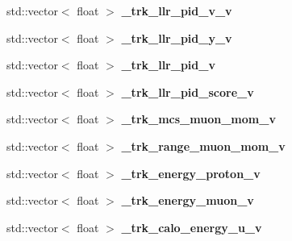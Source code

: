 \begin{DoxyCompactItemize}
\item 
std\+::vector$<$ float $>$ {\bfseries \+\_\+trk\+\_\+llr\+\_\+pid\+\_\+v\+\_\+v}\hypertarget{classanalysis_1_1TrackAnalysis_aed8218478edadddb4d6503686c16448a}{}\label{classanalysis_1_1TrackAnalysis_aed8218478edadddb4d6503686c16448a}

\item 
std\+::vector$<$ float $>$ {\bfseries \+\_\+trk\+\_\+llr\+\_\+pid\+\_\+y\+\_\+v}\hypertarget{classanalysis_1_1TrackAnalysis_a725c93a33d3da91b525b9b1c9d0aad95}{}\label{classanalysis_1_1TrackAnalysis_a725c93a33d3da91b525b9b1c9d0aad95}

\item 
std\+::vector$<$ float $>$ {\bfseries \+\_\+trk\+\_\+llr\+\_\+pid\+\_\+v}\hypertarget{classanalysis_1_1TrackAnalysis_a15121d48891dfed8fbcd02b97875a845}{}\label{classanalysis_1_1TrackAnalysis_a15121d48891dfed8fbcd02b97875a845}

\item 
std\+::vector$<$ float $>$ {\bfseries \+\_\+trk\+\_\+llr\+\_\+pid\+\_\+score\+\_\+v}\hypertarget{classanalysis_1_1TrackAnalysis_a8747290da87b94faec836c472dea9822}{}\label{classanalysis_1_1TrackAnalysis_a8747290da87b94faec836c472dea9822}

\item 
std\+::vector$<$ float $>$ {\bfseries \+\_\+trk\+\_\+mcs\+\_\+muon\+\_\+mom\+\_\+v}\hypertarget{classanalysis_1_1TrackAnalysis_a8c72ab8bf9729ad741b1fcdb1b8916b3}{}\label{classanalysis_1_1TrackAnalysis_a8c72ab8bf9729ad741b1fcdb1b8916b3}

\item 
std\+::vector$<$ float $>$ {\bfseries \+\_\+trk\+\_\+range\+\_\+muon\+\_\+mom\+\_\+v}\hypertarget{classanalysis_1_1TrackAnalysis_a99b7d6a37b1db9ed9875106d7981da17}{}\label{classanalysis_1_1TrackAnalysis_a99b7d6a37b1db9ed9875106d7981da17}

\item 
std\+::vector$<$ float $>$ {\bfseries \+\_\+trk\+\_\+energy\+\_\+proton\+\_\+v}\hypertarget{classanalysis_1_1TrackAnalysis_a29eb249db63679c34d8df831d6df4dcc}{}\label{classanalysis_1_1TrackAnalysis_a29eb249db63679c34d8df831d6df4dcc}

\item 
std\+::vector$<$ float $>$ {\bfseries \+\_\+trk\+\_\+energy\+\_\+muon\+\_\+v}\hypertarget{classanalysis_1_1TrackAnalysis_a469887427d80272b004cd1aa65a2cd69}{}\label{classanalysis_1_1TrackAnalysis_a469887427d80272b004cd1aa65a2cd69}

\item 
std\+::vector$<$ float $>$ {\bfseries \+\_\+trk\+\_\+calo\+\_\+energy\+\_\+u\+\_\+v}\hypertarget{classanalysis_1_1TrackAnalysis_aacb259e3f9425e64986d6fe8a4acdcec}{}\label{classanalysis_1_1TrackAnalysis_aacb259e3f9425e64986d6fe8a4acdcec}


\end{DoxyCompactItemize}
